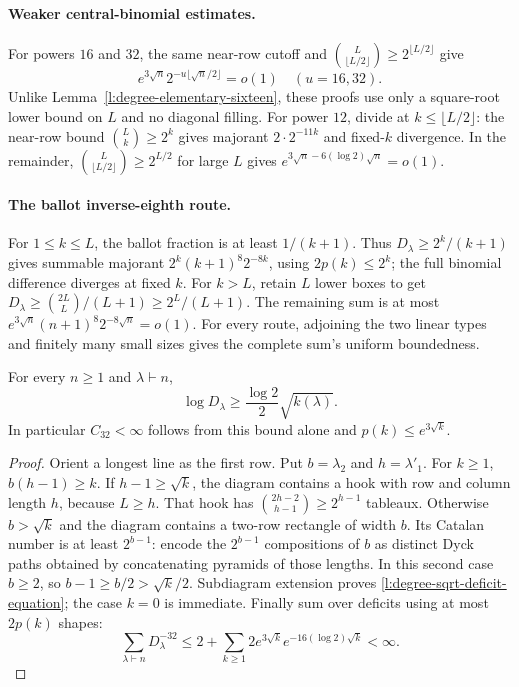 \paragraph{Weaker central-binomial estimates.}
For powers $16$ and $32$, the same near-row cutoff and
$\binom L{\lfloor L/2\rfloor}\ge2^{\lfloor L/2\rfloor}$ give
\begin{equation}\label{l:degree-sqrt-sixteen}
 e^{3\sqrt n}2^{-u\lfloor\sqrt n/2\rfloor}=o(1)
       \quad(u=16,32).
\end{equation}
Unlike Lemma~\ref{l:degree-elementary-sixteen}, these proofs use
only a square-root lower bound on $L$ and no diagonal filling.
For power $12$, divide at $k\le\lfloor L/2\rfloor$:
the near-row bound $\binom Lk\ge2^k$ gives majorant
$2\cdot2^{-11k}$ and fixed-$k$ divergence. In the remainder,
$\binom L{\lfloor L/2\rfloor}\ge2^{L/2}$ for large $L$ gives
$e^{3\sqrt n-6(\log2)\sqrt n}=o(1)$.

\paragraph{The ballot inverse-eighth route.}
For $1\le k\le L$, the ballot fraction is at least $1/(k+1)$.
Thus $D_\lambda\ge2^k/(k+1)$ gives summable majorant
$2^k(k+1)^8 2^{-8k}$, using $2p(k)\le2^k$; the full
binomial difference diverges at fixed $k$. For $k>L$, retain
$L$ lower boxes to get
$D_\lambda\ge\binom{2L}L/(L+1)\ge2^L/(L+1)$.
The remaining sum is at most
$e^{3\sqrt n}(n+1)^8 2^{-8\sqrt n}=o(1)$.
For every route, adjoining the two linear types and finitely many
small sizes gives the complete sum's uniform boundedness.

\begin{lemma}
\label{l:degree-sqrt-deficit}
For every $n\ge1$ and $\lambda\vdash n$,
\begin{equation}\label{l:degree-sqrt-deficit-equation}
 \log D_\lambda\ge\frac{\log2}{2}\sqrt{k(\lambda)}.
\end{equation}
In particular $C_{32}<\infty$ follows from this bound alone and
$p(k)\le e^{3\sqrt k}$.
\end{lemma}
\begin{proof}
Orient a longest line as the first row.  Put $b=\lambda_2$ and
$h=\lambda'_1$.  For $k\ge1$, $b(h-1)\ge k$.
If $h-1\ge\sqrt k$, the diagram contains a hook with row and
column length $h$, because $L\ge h$.  That hook has
$\binom{2h-2}{h-1}\ge2^{h-1}$ tableaux.
Otherwise $b>\sqrt k$ and the diagram contains a two-row rectangle
of width $b$.  Its Catalan number is at least $2^{b-1}$: encode
the $2^{b-1}$ compositions of $b$ as distinct Dyck paths obtained
by concatenating pyramids of those lengths.  In this second case
$b\ge2$, so $b-1\ge b/2>\sqrt k/2$.
Subdiagram extension proves \eqref{l:degree-sqrt-deficit-equation};
the case $k=0$ is immediate.
Finally sum over deficits using at most $2p(k)$ shapes:
\[
 \sum_{\lambda\vdash n}D_\lambda^{-32}
 \le2+\sum_{k\ge1}2e^{3\sqrt k}e^{-16(\log2)\sqrt k}<\infty.
\]
\end{proof}

